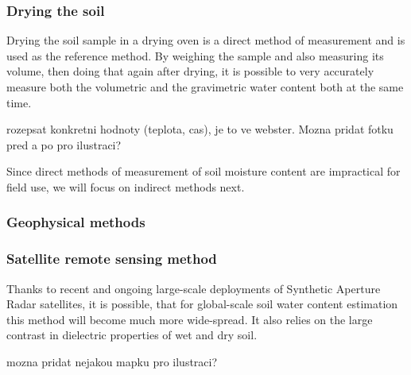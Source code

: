 \subsubsection{Drying the soil}
Drying the soil sample in a drying oven is a direct method of measurement and is used as the reference method. By weighing the sample and also measuring its volume, then doing that again after drying, it is possible to very accurately measure both the volumetric and the gravimetric water content both at the same time.

rozepsat konkretni hodnoty (teplota, cas), je to ve webster. Mozna pridat fotku pred a po pro ilustraci?

Since direct methods of measurement of soil moisture content are impractical for field use, we will focus on indirect methods next.

\subsubsection{Geophysical methods}

\subsubsection{Satellite remote sensing method}
Thanks to recent and ongoing large-scale deployments of Synthetic Aperture Radar satellites, it is possible, that for global-scale soil water content estimation this method will become much more wide-spread. It also relies on the large contrast in dielectric properties of wet and dry soil.

mozna pridat nejakou mapku pro ilustraci?
